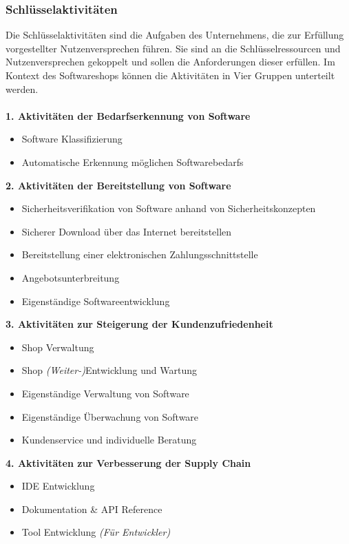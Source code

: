 \subsubsection{Schlüsselaktivitäten}\label{key_activities}
Die Schlüsselaktivitäten sind die Aufgaben des Unternehmens, die zur Erfüllung vorgestellter Nutzenversprechen führen. Sie sind an die Schlüsselressourcen und Nutzenversprechen gekoppelt und sollen die Anforderungen dieser erfüllen. Im Kontext des Softwareshops können die Aktivitäten in Vier Gruppen unterteilt werden.\\\\
\textbf{1. Aktivitäten der Bedarfserkennung von Software}
\begin{itemize}
	\item Software Klassifizierung
	\item Automatische Erkennung möglichen Softwarebedarfs
\end{itemize}
\vspace{0.2cm}
\textbf{2. Aktivitäten der Bereitstellung von Software}
\begin{itemize}
	\item Sicherheitsverifikation von Software anhand von Sicherheitskonzepten
	\item Sicherer Download über das Internet bereitstellen
	\item Bereitstellung einer elektronischen Zahlungsschnittstelle
	\item Angebotsunterbreitung
	\item Eigenständige Softwareentwicklung
\end{itemize}
\vspace{0.2cm}
\textbf{3. Aktivitäten zur Steigerung der Kundenzufriedenheit}
\begin{itemize}
	\item Shop Verwaltung
	\item Shop \textit{(Weiter-)}Entwicklung und Wartung
	\item Eigenständige Verwaltung von Software
	\item Eigenständige Überwachung von Software
	\item Kundenservice und individuelle Beratung
\end{itemize}
\vspace{0.2cm}
\textbf{4. Aktivitäten zur Verbesserung der Supply Chain}
\begin{itemize}
	\item IDE Entwicklung
	\item Dokumentation \& API Reference
	\item Tool Entwicklung \textit{(Für Entwickler)}
\end{itemize}

